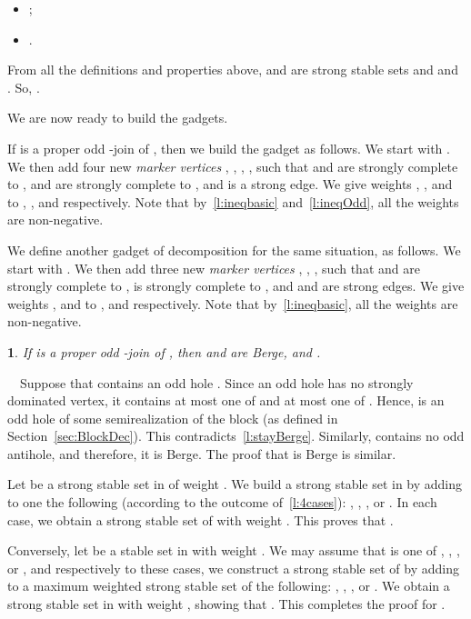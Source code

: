 \documentclass[11 pt] {article}
\newcommand\blackslug{\hbox{\hskip 1pt \vrule width 4pt height 8pt depth 1.5pt
        \hskip 1pt}}
\newcommand\bbox{\hfill \quad \blackslug \medbreak}
\newtheorem{lemma}[theorem]{}
\newcounter{claim}
\newcommand{\Proof}{\setcounter{claim}{0}\noindent{\bf Proof.}\ \ }
\begin{document}
  \begin{itemize}
  \item ;
  \item .
  \end{itemize}

  From all the definitions and properties above,  and  are
  strong stable sets and  and .
  So, .  \bbox






We are now ready to build the gadgets. 

If  is a proper odd -join of , then we build the
gadget  as follows. We start with . We then add four
new \emph{marker vertices} , , , , such that  and
 are strongly complete to ,  and  are strongly
complete to , and  is a strong edge.  We give weights
, , 
and  to , ,  and  respectively.
Note that by~\ref{l:ineqbasic} and~\ref{l:ineqOdd}, all the weights
are non-negative.

We define another gadget of decomposition  for the same
situation, as follows. We start with . We then add three new
\emph{marker vertices} , , , such that  and  are
strongly complete to ,  is strongly complete to , and
 and  are strong edges.  We give weights ,  and 
to ,  and  respectively.  Note that by~\ref{l:ineqbasic},
all the weights are non-negative.


\begin{lemma}
  \label{l:oddblock3}
  If  is a proper odd -join of , then  and
   are Berge, and .
\end{lemma}

\Proof Suppose that  contains an odd hole .  Since an odd
hole has no strongly dominated vertex, it contains at most one of  and at most one of .  Hence,  is an odd hole of some
semirealization of the block  (as defined in
Section~\ref{sec:BlockDec}). This contradicts~\ref{l:stayBerge}.
Similarly,  contains no odd antihole, and therefore, it is
Berge.  The proof that  is Berge is similar.

Let  be a strong stable set in  of weight .  We build
a strong stable set in  by adding to  one the
following (according to the outcome of~\ref{l:4cases}): ,
, , or .  In each case, we obtain
a strong stable set of  with weight .
This proves that .

Conversely, let  be a stable set in  with weight
.  We may assume that  is
one of , , , or , and
respectively to these cases, we construct a strong stable set of 
by adding to  a maximum weighted strong stable set of the
following: ,  , , or
.  We obtain a strong stable set in  with weight
, showing that  . This completes the proof for . 
\end{document}
